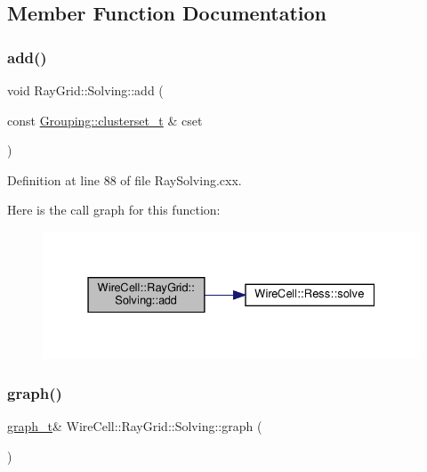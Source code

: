 \subsection{Member Function Documentation}
\mbox{\label{class_wire_cell_1_1_ray_grid_1_1_solving_acc6a071b6551c07e799bc36fddc0fef3}} 
\subsubsection{\texorpdfstring{add()}{add()}}
{\footnotesize\ttfamily void Ray\+Grid\+::\+Solving\+::add (\begin{DoxyParamCaption}\item[{const \hyperlink{class_wire_cell_1_1_ray_grid_1_1_grouping_a0a4ee47c906176803dd7b3e42803d0ed}{Grouping\+::clusterset\+\_\+t} \&}]{cset }\end{DoxyParamCaption})}



Definition at line 88 of file Ray\+Solving.\+cxx.

Here is the call graph for this function\+:
\nopagebreak
\begin{figure}[H]
\begin{center}
\leavevmode
\includegraphics[width=331pt]{class_wire_cell_1_1_ray_grid_1_1_solving_acc6a071b6551c07e799bc36fddc0fef3_cgraph}
\end{center}
\end{figure}
\mbox{\label{class_wire_cell_1_1_ray_grid_1_1_solving_a866d05a9071d9d0bf1a08402587b3b76}} 
\subsubsection{\texorpdfstring{graph()}{graph()}}
{\footnotesize\ttfamily \hyperlink{class_wire_cell_1_1_ray_grid_1_1_solving_ac9cb5afd9b0590c4671a239347dc5e34}{graph\+\_\+t}\& Wire\+Cell\+::\+Ray\+Grid\+::\+Solving\+::graph (\begin{DoxyParamCaption}{ }\end{DoxyParamCaption})\hspace{0.3cm}{\ttfamily [inline]}}



